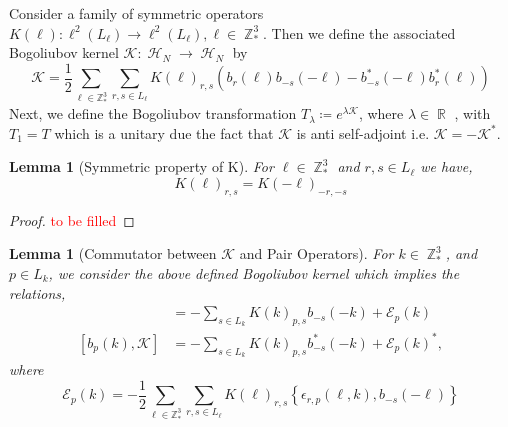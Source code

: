 \documentclass[sn-mathphys, Numbered ,a4paper]{sn-jnl}%
\DeclareMathOperator{\R}{\mathbb{R}}
\DeclareMathOperator{\Z}{\mathbb{Z}}
\DeclareMathOperator{\HH}{\mathcal{H}}
\newcommand{\half}{\frac{1}{2}}
\theoremstyle{plain}
\newtheorem{lemma}[theorem]{Lemma}
\theoremstyle{definition}
\theoremstyle{remark}
\theoremstyle{plain}
\theoremstyle{definition}
\theoremstyle{remark}
\begin{document}
Consider a family of symmetric operators $K(\ell):\ell^2(L_\ell)\rightarrow \ell^2(L_\ell), \ell \in \Z^3_* $. Then we define the associated Bogoliubov kernel $\mathcal{K}:\HH_N\rightarrow\HH_N $ by
\begin{equation}
\mathcal{K} = \frac{1}{2}\sum\limits_{\ell\in \mathbb{Z}^3_*}\sum\limits_{r,s\in L_\ell}K(\ell)_{r,s}\left(b_r(\ell)b_{-s}(-\ell)-b^*_{-s}(-\ell)b^*_{r}(\ell)\right)
\end{equation}
Next, we define the Bogoliubov transformation $ T_\lambda\coloneq e^{\lambda\mathcal{K}}$, where $\lambda \in \R$ , with $T_1=T$ which is a unitary due the fact that $\mathcal{K}$ is anti self-adjoint i.e. $\mathcal{K}=-\mathcal{K}^* $.\newline
\begin{lemma}[Symmetric property of K]
    For $\ell \in \Z^3_*$ and $r,s \in L_{\ell}$ we have,
    \begin{equation}
        K(\ell)_{r,s} = K(-\ell)_{-r,-s}
    \end{equation}
\end{lemma}
\begin{proof}
    \textcolor{red}{to be filled}
\end{proof}
\begin{lemma}[Commutator between $\mathcal{K} $ and Pair Operators]
For $k \in \Z^3_*$, and $p \in L_{k}$, we consider the above defined Bogoliubov kernel which implies the relations,
\begin{align}
    [b^*_p(k),\mathcal{K}] &=-\sum\limits_{s\in L_{k}}K(k)_{p,s}b_{-s}(-k) + \mathcal{E}_{p}(k)\label{eq:13} \\
    [b_p(k),\mathcal{K}] &=-\sum\limits_{s\in L_{k}}K(k)_{p,s}b^*_{-s}(-k) + \mathcal{E}_{p}(k)^*\label{eq:14},
\end{align}
    where
\begin{equation}\label{eq:commerrKb}
    \mathcal{E}_{p}(k) = -\frac{1}{2}\sum\limits_{\ell\in \mathbb{Z}^3_*}\sum\limits_{r,s\in L_\ell}K(\ell)_{r,s}\left\{\epsilon_{r,p}(\ell,k),b_{-s}(-\ell)\right\} 
\end{equation}
\end{lemma}
\end{document}
